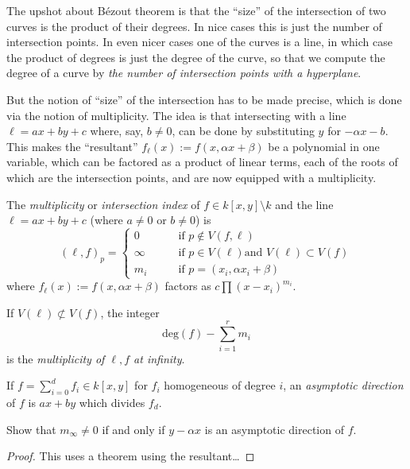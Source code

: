 \medskip\noindent
The upshot about Bézout theorem is that the
``size'' of the intersection
of two curves is the product of their
degrees.
In nice cases this is just the number of
intersection points.
In even nicer cases one of the curves is a
line,
in which case the product of degrees is
just the degree of the curve,
so that we compute the degree of a curve by
{\it the number of intersection points with a
hyperplane}.

But the notion of ``size'' of the
intersection
has to be made precise, which is done via the
notion of multiplicity.
The idea is that intersecting with a line
$\ell=ax +by+c$ where, say,  $b \neq 0$,
can be done by substituting $y$
for $-\alpha x-b$.
This makes the ``resultant''
$f_\ell(x):=f(x,\alpha x+\beta)$
be a polynomial in one variable,
which can be factored as a product of linear
terms, each of the roots of which
are the intersection points,
and are now equipped with a multiplicity.

\begin{definition}
\label{definition-multiplicity-line}
The {\it multiplicity} or {\it intersection
index}
of $f\in k[x,y]\setminus k$ and
the line $\ell=ax+by+c$ (where $a \neq 0$ or
$b\neq 0$) is
$$
(\ell,f)_p =
\begin{cases}
0\qquad &\text{if }p \not\in V(f,\ell) \\
\infty \qquad &\text{if }p \in V(\ell) \text{
and }V(\ell) \subset V(f)\\
m_i \qquad & \text{if }p=(x_i,\alpha
x_i+\beta)
\end{cases}
$$
where $f_\ell(x):=f(x,\alpha x+\beta)$
factors as $c\prod(x-x_i)^{m_i}$.

If $V(\ell)\not \subset V(f)$, the integer
$$
\text{deg}(f)-\sum_{i=1}^rm_i
$$
is the {\it multiplicity of $\ell,f$ at
infinity}.
\end{definition}

\begin{exercise}
\label{exercise-asymptotic-direction}
If $f=\sum_{i=0}^df_i \in k[x,y]$ for $f_i$
homogeneous of degree $i$,
an {\it asymptotic direction} of $f$ is
$ax+by$
which divides $f_d$.

Show that  $m_\infty \neq 0$ if and only if
$y-\alpha x$
is an asymptotic direction of $f$.
\end{exercise}

\begin{proof}
This uses a theorem using the resultant…
\end{proof}

